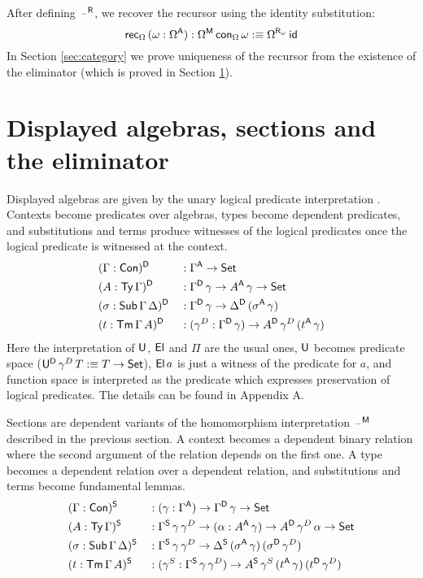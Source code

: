 \documentclass[acmsmall,screen]{acmart}
\begin{document}
After defining $\mathord{\hspace{1pt}\text{--}\hspace{1pt}}^{\mathsf{R}}$, we recover the recursor using the identity
substitution:
\[
\mathsf{rec}_\Omega\,(\omega:\Omega^{\mathsf{A}}):\Omega^{\mathsf{M}}\,\mathsf{con}_\Omega\,\omega :\equiv \Omega^{\mathsf{R}_\omega}\,\mathsf{id}
\]
In Section \ref{sec:category} we prove uniqueness of the recursor from
the existence of the eliminator (which is proved in Section
\ref{sec:eliminator}).


\section{Displayed algebras, sections and the eliminator}
\label{sec:eliminator}

Displayed algebras are given by the unary logical predicate
interpretation \cite{bernardy12parametricity,atkey}. Contexts become
predicates over algebras, types become dependent predicates, and
substitutions and terms produce witnesses of the logical predicates
once the logical predicate is witnessed at the context.
\begin{alignat*}{5}
  & (\Gamma:\mathsf{Con})^{\mathsf{D}} && : \Gamma^{\mathsf{A}}\rightarrow\mathsf{Set} \\
  & (A:\mathsf{Ty}\,\Gamma)^{\mathsf{D}} && : \Gamma^{\mathsf{D}}\,\gamma\rightarrow A^{\mathsf{A}}\,\gamma\rightarrow\mathsf{Set} \\
  & (\sigma:\mathsf{Sub}\,\Gamma\,\Delta)^{\mathsf{D}} && : \Gamma^{\mathsf{D}}\,\gamma\rightarrow\Delta^{\mathsf{D}}\,(\sigma^{\mathsf{A}}\,\gamma) \\
  & (t:\mathsf{Tm}\,\Gamma\,A)^{\mathsf{D}} && : (\gamma^D:\Gamma^{\mathsf{D}}\,\gamma)\rightarrow A^{\mathsf{D}}\,\gamma^D\,(t^{\mathsf{A}}\,\gamma)
\end{alignat*}
Here the interpretation of $\mathsf{U}$, $\mathsf{El}$ and $\Pi$ are the usual ones,
$\mathsf{U}$ becomes predicate space ($\mathsf{U}^{\mathsf{D}}\,\gamma^D\,T :\equiv T\rightarrow\mathsf{Set}$),
$\mathsf{El}\,a$ is just a witness of the predicate for $a$, and function
space is interpreted as the predicate which expresses preservation of
logical predicates. The details can be found in Appendix A.

Sections are dependent variants of the homomorphism interpretation
$\mathord{\hspace{1pt}\text{--}\hspace{1pt}}^{\mathsf{M}}$ described in the previous section. A context becomes a
dependent binary relation where the second argument of the relation
depends on the first one. A type becomes a dependent relation over a
dependent relation, and substitutions and terms become fundamental
lemmas.
\begin{alignat*}{5}
  & (\Gamma:\mathsf{Con})^{\mathsf{S}} && : (\gamma:\Gamma^{\mathsf{A}})\rightarrow\Gamma^{\mathsf{D}}\,\gamma\rightarrow\mathsf{Set} \\
  & (A:\mathsf{Ty}\,\Gamma)^{\mathsf{S}} && : \Gamma^{\mathsf{S}}\,\gamma\,\gamma^D\rightarrow (\alpha:A^{\mathsf{A}}\,\gamma)\rightarrow A^{\mathsf{D}}\,\gamma^D\,\alpha\rightarrow\mathsf{Set} \\
  & (\sigma:\mathsf{Sub}\,\Gamma\,\Delta)^{\mathsf{S}} && : \Gamma^{\mathsf{S}}\,\gamma\,\gamma^D\rightarrow\Delta^{\mathsf{S}}\,(\sigma^{\mathsf{A}}\,\gamma)\,(\sigma^{\mathsf{D}}\,\gamma^D) \\
  & (t:\mathsf{Tm}\,\Gamma\,A)^{\mathsf{S}} && : (\gamma^S:\Gamma^{\mathsf{S}}\,\gamma\,\gamma^D)\rightarrow A^{\mathsf{S}}\,\gamma^S\,(t^{\mathsf{A}}\,\gamma)\,(t^{\mathsf{D}}\,\gamma^D)
\end{alignat*}
\end{document}
